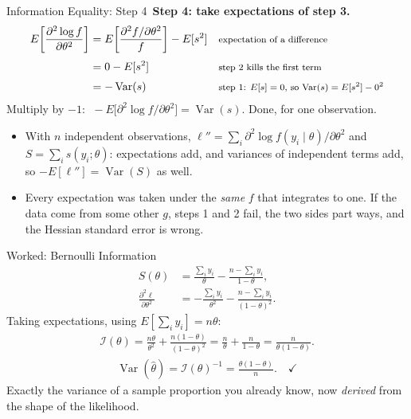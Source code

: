 \documentclass[aspectratio=169,11pt,xcolor=dvipsnames]{beamer}
\DeclareMathOperator{\Var}{Var}
\newcommand{\E}{E}
\newcommand{\loglik}{\ell}
\newcommand{\Info}{\mathcal{I}}
\newcommand{\adv}{\,\raisebox{0.6pt}{\textcolor{accent}{$\bigstar$}}}
\begin{document}
\begin{frame}{Information Equality: Step 4\adv}
\textbf{Step 4: take expectations of step 3.}
\begin{align*}
  \E\!\left[\frac{\partial^2 \log f}{\partial\theta^2}\right]
  &= \E\!\left[\frac{\partial^2 f/\partial\theta^2}{f}\right] - \E[s^2]
    && \text{\footnotesize expectation of a difference} \\[3pt]
  &= 0 - \E[s^2]
    && \text{\footnotesize step 2 kills the first term} \\[3pt]
  &= -\Var(s)
    && \text{\footnotesize step 1: $\E[s]=0$, so $\Var(s) = \E[s^2] - 0^2$}
\end{align*}
Multiply by $-1$:
$\;-\E\big[\partial^2 \log f/\partial\theta^2\big] = \Var(s)$. Done, for one observation.
\vskip4pt
\begin{itemize}\itemsep2pt
  \item With $n$ independent observations, $\loglik'' = \sum_i \partial^2\log f(y_i\mid\theta)/\partial\theta^2$
        and $S = \sum_i s(y_i;\theta)$: expectations add, and variances of
        independent terms add, so $-\E[\loglik''] = \Var(S)$ as well.
  \item Every expectation was taken under the \emph{same} $f$ that
        integrates to one. If the data come from some other $g$, steps 1
        and 2 fail, the two sides part ways, and the Hessian standard error
        is wrong.
\end{itemize}
\end{frame}

\begin{frame}{Worked: Bernoulli Information}
\begin{align*}
  S(\theta) &= \frac{\sum_i y_i}{\theta} - \frac{n-\sum_i y_i}{1-\theta}, \\[3pt]
  \frac{\partial^2\loglik}{\partial\theta^2}
  &= -\frac{\sum_i y_i}{\theta^2} - \frac{n - \sum_i y_i}{(1-\theta)^2} .
\end{align*}
Taking expectations, using $\E[\sum_i y_i] = n\theta$:
\begin{align*}
  \Info(\theta)
  = \frac{n\theta}{\theta^2} + \frac{n(1-\theta)}{(1-\theta)^2}
  = \frac{n}{\theta} + \frac{n}{1-\theta}
  = \frac{n}{\theta(1-\theta)} .
\end{align*}
\pause
\begin{align*}
  \Var(\hat\theta) = \Info(\theta)^{-1} = \frac{\theta(1-\theta)}{n} . \quad\checkmark
\end{align*}
Exactly the variance of a sample proportion you already know, now \emph{derived}
from the shape of the likelihood.
\end{frame}
\end{document}
